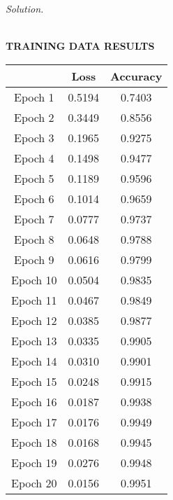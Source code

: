 \documentclass[12pt]{article}
\newcommand\sol[1]{\begin{mdframed}
\emph{Solution.} #1
\end{mdframed}}
\begin{document}
\sol {
\begin{center}
  \textbf{\\TRAINING DATA RESULTS}  
\end{center}
\begin{center}
\begin{tabular}{||c c c ||} 
 \hline
       & Loss & Accuracy \\ [0.5ex] 
 \hline\hline
 Epoch 1  & 0.5194  & 0.7403\\ 
 \hline
 Epoch 2 & 0.3449  & 0.8556\\
 \hline
 Epoch 3   & 0.1965    & 0.9275\\
 \hline
 Epoch 4  & 0.1498   & 0.9477\\
 \hline
 Epoch 5  & 0.1189 & 0.9596\\ 
 \hline
 Epoch 6 & 0.1014  & 0.9659\\
 \hline
 Epoch 7  & 0.0777 & 0.9737 \\
 \hline
 Epoch 8  & 0.0648 & 0.9788\\
 \hline
 Epoch 9  & 0.0616  & 0.9799 \\ 
 \hline
 Epoch 10 & 0.0504 & 0.9835 \\
 \hline
 Epoch 11   & 0.0467 & 0.9849  \\
 \hline
 Epoch 12  & 0.0385 & 0.9877 \\
 \hline
 Epoch 13  & 0.0335  & 0.9905  \\
 \hline
 Epoch 14 & 0.0310  & 0.9901\\ 
 \hline
 Epoch 15 & 0.0248 & 0.9915\\
 \hline
 Epoch 16   & 0.0187   & 0.9938  \\
 \hline
 Epoch 17  & 0.0176 & 0.9949\\
 \hline
 Epoch 18  & 0.0168 & 0.9945\\
 \hline
 Epoch 19  & 0.0276 & 0.9948 \\
 \hline
  Epoch 20  & 0.0156 & 0.9951  \\
 \hline

\end{tabular}
\end{center}

}
\end{document}
